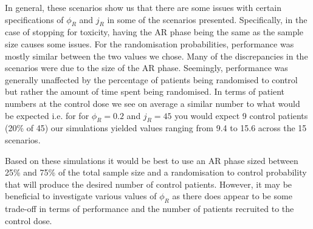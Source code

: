 In general, these scenarios show us that there are some issues with certain specifications of $\phi_R$ and $j_R$ in some of the scenarios presented. Specifically, in the case of stopping for toxicity, having the AR phase being the same as the sample size causes some issues. For the randomisation probabilities, performance was mostly similar between the two values we chose. Many of the discrepancies in the scenarios were due to the size of the AR phase. Seemingly, performance was generally unaffected by the percentage of patients being randomised to control but rather the amount of time spent being randomised. In terms of patient numbers at the control dose we see on average a similar number to what would be expected i.e. for  for $\phi_R = 0.2$ and  $j_R = 45$ you would expect 9 control patients (20\% of 45) our simulations yielded values ranging from 9.4 to 15.6 across the 15 scenarios. 

Based on these simulations it would be best to use an AR phase sized between 25\% and 75\% of the total sample size and a randomisation to control probability that will produce the desired number of control patients. However, it may be beneficial to investigate various values of $\phi_R$ as there does appear to be some trade-off in terms of performance and the number of patients recruited to the control dose.





